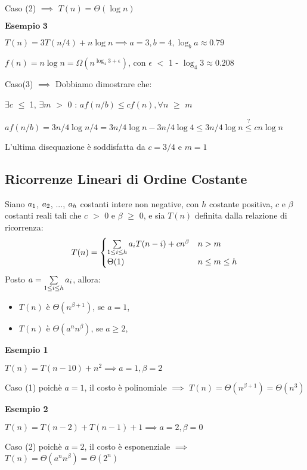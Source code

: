 \documentclass[../cheatSheetAlgoritmi.tex]{subfiles}
\begin{document}
Caso (2) $\implies$ $T(n) = \Theta(\log{n})$

\bigskip

$\textbf{Esempio 3}$

$T(n) = 3T(n/4) + n\log{n} \implies a = 3, b = 4, \log_{b}{a} \approx 0.79$

$f(n) = n\log{n} = \Omega(n^{\log_{4}{3} + \epsilon})$, con $\epsilon$ $<$ 1 - $\log_{4}{3} \approx 0.208$

\bigskip

Caso(3) $\implies$ Dobbiamo dimostrare che:

$\exists c$ $\leq$ 1, $\exists m$ $>$ 0 : $af(n/b) \leq cf(n), \forall n$ $\geq$ $m$

$af(n/b) = 3n/4\log{n/4} = 3n/4\log{n} - 3n/4\log{4} \leq 3n/4\log{n} \stackrel{?}{\leq} cn\log{n}$

L'ultima disequazione è soddisfatta da $c = 3/4$ e $m = 1$
\subsection{Ricorrenze Lineari di Ordine Costante}
Siano $a\textsubscript{$1$}$, $a\textsubscript{$2$}$, $...$, $a\textsubscript{$h$}$ costanti intere non negative, con $h$ costante positiva, $c$ e $\beta$ costanti reali tali che $c$ $>$ 0 e $\beta$ $\geq$ 0, e sia $T(n)$ definita dalla relazione di ricorrenza:
	\begin{equation*}
  		T(n)=\begin{cases}
     		\sum\limits_{1 \leq i \leq h} {a \textsubscript{$i$} T(n-i)} + cn^{\beta} & \text{$n > m$}\\
    		\Theta(1) & \text{$n \leq m \leq h$}
  		\end{cases}
	\end{equation*}
Posto $a = \sum\limits_{1 \leq i \leq h} {a \textsubscript{$i$}}$, allora: 
\begin{itemize}
	\item $T(n)$ è $\Theta(n^{\beta+1})$, se $a = 1$,
	\item $T(n)$ è $\Theta(a^{n}n^{\beta})$, se $a \geq 2$,
\end{itemize}
\textbf{Esempio 1}

$T(n) = T(n - 10) + n^{2} \implies a = 1, \beta = 2$

Caso (1) poichè $a = 1$, il costo è polinomiale $\implies$ $T(n) = \Theta(n^{\beta+1}) = \Theta(n^{3})$

\bigskip

\textbf{Esempio 2}

$T(n) = T(n - 2) +  T(n - 1) + 1 \implies a = 2, \beta = 0$

Caso (2) poichè $a = 2$, il costo è esponenziale $\implies$ $T(n) = \Theta(a^{n}n^{\beta}) = \Theta(2^n)$
\newpage
\end{document}
